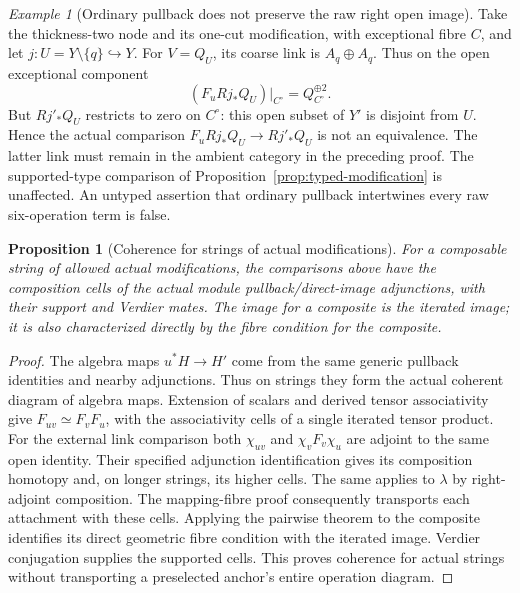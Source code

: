 \documentclass[11pt]{article}
\newtheorem{proposition}[theorem]{Proposition}
\theoremstyle{definition}
\theoremstyle{remark}
\newtheorem{example}[theorem]{Example}
\begin{document}
\begin{example}[Ordinary pullback does not preserve the raw right open image]
\label{ex:right-open-obstruction}
Take the thickness-two node and its one-cut modification, with
exceptional fibre $C$, and let $j:U=Y\setminus\{q\}\hookrightarrow Y$.
For $V=Q_U$, its coarse link is $A_q\oplus A_q$.  Thus on the open
exceptional component
\[
 (F_uRj_*Q_U)|_{C^\circ}=Q_{C^\circ}^{\oplus2}.
\]
But $Rj'_*Q_U$ restricts to zero on $C^\circ$: this open subset of
$Y'$ is disjoint from $U$.  Hence the actual comparison
$F_uRj_*Q_U\to Rj'_*Q_U$ is not an equivalence.  The latter link
must remain in the ambient category in the preceding proof.
The supported-type comparison of Proposition~\ref{prop:typed-modification}
is unaffected.  An untyped assertion that ordinary pullback
intertwines every raw six-operation term is false.
\end{example}

\begin{proposition}[Coherence for strings of actual modifications]
\label{prop:actual-string-coherence}
For a composable string of allowed actual modifications, the
comparisons above have the composition cells of the actual module
pullback/direct-image adjunctions, with their support and Verdier
mates.  The image for a composite is the iterated image; it is also
characterized directly by the fibre condition for the composite.
\end{proposition}
\begin{proof}
The algebra maps $u^*H\to H'$ come from the same generic pullback
identities and nearby adjunctions.  Thus on strings they form the
actual coherent diagram of algebra maps.  Extension of scalars
and derived tensor associativity give $F_{uv}\simeq F_vF_u$,
with the associativity cells of a single iterated tensor product.
For the external link comparison both
$\chi_{uv}$ and $\chi_vF_v\chi_u$ are adjoint to the same open
identity.  Their specified adjunction identification gives its
composition homotopy and, on longer strings, its higher cells.
The same applies to $\lambda$ by right-adjoint composition.
The mapping-fibre proof consequently transports each attachment
with these cells.  Applying the pairwise theorem to the composite
identifies its direct geometric fibre condition with the iterated
image.  Verdier conjugation supplies the supported cells.
This proves coherence for actual strings without transporting a
preselected anchor's entire operation diagram.
\end{proof}
\end{document}
